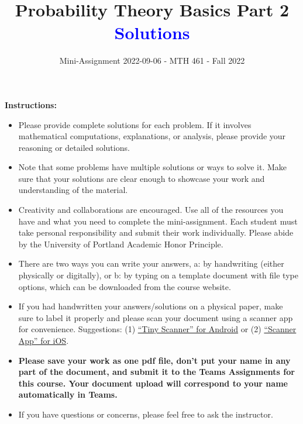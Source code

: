 \documentclass[
]{article}
\title{\textbf{Probability Theory Basics Part 2 \textcolor{blue}{Solutions}}}
\subtitle{Mini-Assignment 2022-09-06 - MTH 461 - Fall 2022}
\author{}
\date{\vspace{-2.5em}}
\begin{document}
\maketitle

\hfill\break

\textbf{Instructions:}

\begin{itemize}
\item
  Please provide complete solutions for each problem. If it involves mathematical computations, explanations, or analysis, please provide your reasoning or detailed solutions.
\item
  Note that some problems have multiple solutions or ways to solve it. Make sure that your solutions are clear enough to showcase your work and understanding of the material.
\item
  Creativity and collaborations are encouraged. Use all of the resources you have and what you need to complete the mini-assignment. Each student must take personal responsibility and submit their work individually. Please abide by the University of Portland Academic Honor Principle.
\item
  There are two ways you can write your answers, a: by handwriting (either physically or digitally), or b: by typing on a template document with file type options, which can be downloaded from the course website.
\item
  If you had handwritten your answers/solutions on a physical paper, make sure to label it properly and please scan your document using a scanner app for convenience. Suggestions: (1) \href{https://play.google.com/store/apps/details?id=com.appxy.tinyscanner\&hl=en_US\&gl=US}{``Tiny Scanner'' for Android} or (2) \href{https://apps.apple.com/us/app/scanner-app-scan-pdf-document/id595563753}{``Scanner App'' for iOS}.
\item
  \textbf{Please save your work as one pdf file, don't put your name in any part of the document, and submit it to the Teams Assignments for this course. Your document upload will correspond to your name automatically in Teams.}
\item
  If you have questions or concerns, please feel free to ask the instructor.
\end{itemize}

\newpage
\end{document}
